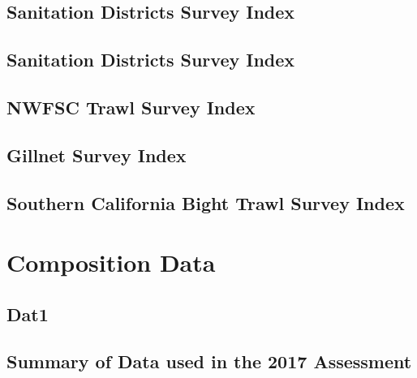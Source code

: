 \documentclass[ignorenonframetext,compress]{beamer}
\begin{document}
\begin{table}[ht]
\centering
{}
\end{table}

\subsection{Sanitation Districts Survey
Index}\label{sanitation-districts-survey-index-1}

\subsection{Sanitation Districts Survey
Index}\label{sanitation-districts-survey-index-2}

\subsection{NWFSC Trawl Survey Index}\label{nwfsc-trawl-survey-index}

\subsection{Gillnet Survey Index}\label{gillnet-survey-index}

\subsection{Southern California Bight Trawl Survey
Index}\label{southern-california-bight-trawl-survey-index}

\section{Composition Data}\label{composition-data}

\subsection{Dat1}\label{dat1}

\subsection{Summary of Data used in the 2017
Assessment}\label{summary-of-data-used-in-the-2017-assessment}
\end{document}
